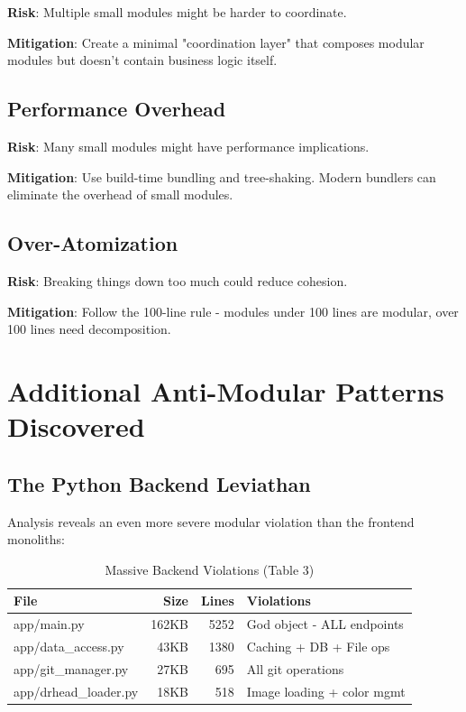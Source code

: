 \documentclass[11pt]{article}
\begin{document}
\textbf{Risk}: Multiple small modules might be harder to coordinate.

\textbf{Mitigation}: Create a minimal "coordination layer" that composes modular modules but doesn't contain business logic itself.

\subsection{Performance Overhead}

\textbf{Risk}: Many small modules might have performance implications.

\textbf{Mitigation}: Use build-time bundling and tree-shaking. Modern bundlers can eliminate the overhead of small modules.

\subsection{Over-Atomization}

\textbf{Risk}: Breaking things down too much could reduce cohesion.

\textbf{Mitigation}: Follow the 100-line rule - modules under 100 lines are modular, over 100 lines need decomposition.

\section{Additional Anti-Modular Patterns Discovered}

\subsection{The Python Backend Leviathan}

Analysis reveals an even more severe modular violation than the frontend monoliths:

\begin{table}[h]
\centering
\begin{tabular}{|l|r|r|l|}
\hline
\textbf{File} & \textbf{Size} & \textbf{Lines} & \textbf{Violations} \\
\hline
app/main.py & 162KB & 5252 & God object - ALL endpoints \\
app/data\_access.py & 43KB & 1380 & Caching + DB + File ops \\
app/git\_manager.py & 27KB & 695 & All git operations \\
app/drhead\_loader.py & 18KB & 518 & Image loading + color mgmt \\
\hline
\end{tabular}
\caption{Massive Backend Violations (Table 3)}
\end{table}
\label{table:backend-violations}
\end{document}
